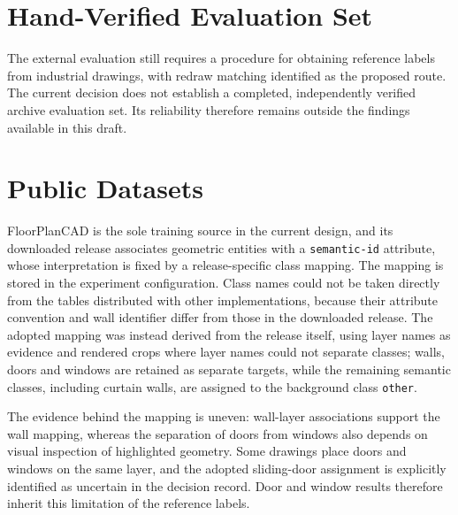 \section{Hand-Verified Evaluation Set}
\label{sec:hand-verified-set}
The external evaluation still requires a procedure for obtaining reference labels
from industrial drawings, with redraw matching identified as the proposed route.
The current decision does not establish a completed, independently verified
archive evaluation set.
Its reliability therefore remains outside the findings available in this draft.


\section{Public Datasets}
\label{sec:public-datasets}
FloorPlanCAD is the sole training source in the current design, and its downloaded
release associates geometric entities with a
\texttt{semantic-id} attribute, whose interpretation is fixed by a release-specific
class mapping.
The mapping is stored in the experiment configuration.
Class names could not be taken directly from the tables distributed with other
implementations, because their attribute convention and wall identifier differ
from those in the downloaded release.
The adopted mapping was instead derived from the release itself, using layer names
as evidence and rendered crops where layer names could not separate classes;
walls, doors and windows are retained as separate targets, while the remaining semantic
classes, including curtain walls, are assigned to the background class
\texttt{other}.

The evidence behind the mapping is uneven: wall-layer associations support the
wall mapping, whereas the separation of doors
from windows also depends on visual inspection of highlighted geometry.
Some drawings place doors and windows on the same layer, and the adopted sliding-door
assignment is explicitly identified as uncertain in the decision record.
Door and window results therefore inherit this limitation of the reference labels.

